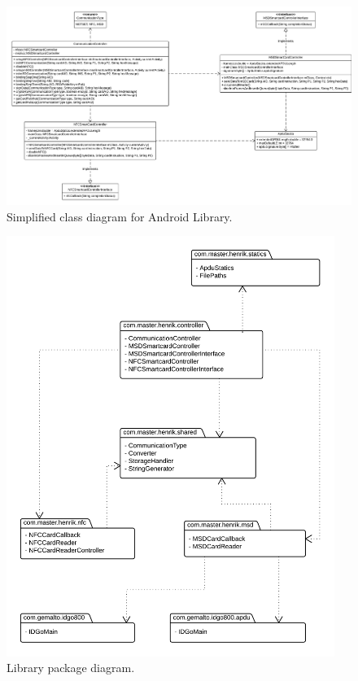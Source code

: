 \begin{figure}[h!]
  \caption{Simplified class diagram for Android Library.}
  \label{fig:classdiagram_simple}
  \centering
    \includegraphics[width=1.25\textwidth, angle =90]{images/Class_Diagram.png}
\end{figure}
\clearpage

\begin{figure}[h!]
  \caption{Library package diagram.}
  \label{fig:package}
  \centering
    \includegraphics[width=0.95\textwidth]{images/package2.png}
\end{figure}


